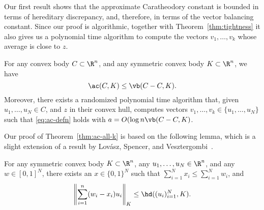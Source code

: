 Our first result shows that the approximate Caratheodory constant is
bounded in terms of hereditary discrepancy, and, therefore, in terms
of the vector balancing constant.  Since our proof is algorithmic,
together with Theorem~\ref{thm:tightness} it also gives us a
polynomial time algorithm to compute the vectors $v_1, \ldots, v_k$
whose average is close to $z$.

\begin{theorem}\label{thm:ac-all-k}
  For any convex body $C \subset \R^n$, and any symmetric convex body
  $K \subset \R^n$, we have
  \[
  \ac(C,K) \le \vb(C-C,K).
  \]
  Moreover, there exists a randomized polynomial time algorithm that,
  given $u_1, \ldots, u_N \in C$, and $z$ in their convex hull,
  computes vectors $v_1, \ldots, v_k \in \{u_1, \ldots, u_N\}$ such
  that \eqref{eq:ac-defn} holds with $a = O(\log n \vb(C-C, K)$.
\end{theorem}

Our proof of Theorem~\ref{thm:ac-all-k} is based on the following
lemma, which is a slight extension of a result by Lov\'asz, Spencer,
and Vesztergombi~\cite{LSV}.

\begin{lemma}\label{lm:ac-to-herdisc}
  For any symmetric convex body $K \subset\R^n$, any $u_1, \ldots, u_N
  \in \R^n$, and any $w \in [0,1]^N$, there exists an $x\in \{0,1\}^N$
  such that $\sum_{i = 1}^N{x_i} \le \sum_{i = 1}^N{w_i}$, and
  \[
  \left\|\sum_{i = 1}^n(w_i - x_i)u_i\right\|_K \le \hd((u_i)_{i =  1}^N, K).
  \]
\end{lemma}